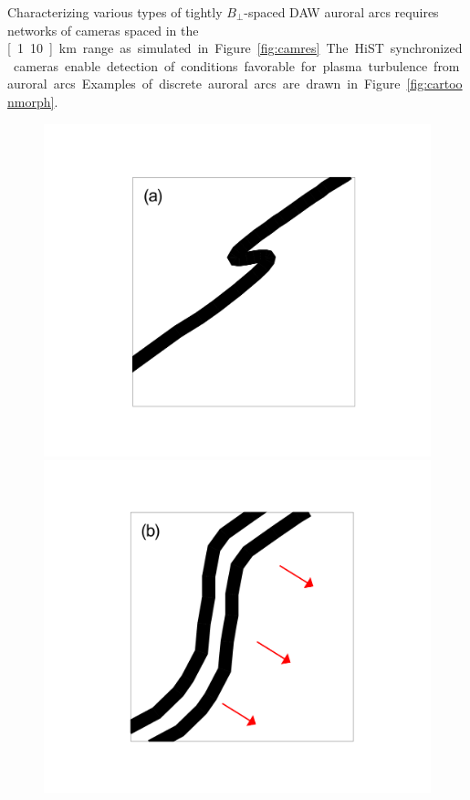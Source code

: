 Characterizing various types of tightly $B_\perp$-spaced DAW auroral arcs requires networks of cameras spaced in the \unit[1..10]{km} range as simulated in Figure~\ref{fig:camres}.
The HiST synchronized cameras enable detection of conditions favorable for plasma turbulence from auroral arcs.
Examples of discrete auroral arcs are drawn in Figure~\ref{fig:cartoonmorph}.
\begin{figure}\centering
	\begin{minipage}{0.3\textwidth}\centering
		\includegraphics[width=0.9\columnwidth,trim=150 100 150 100,clip]{gfx/aurora_kinked}
	\end{minipage}
	\begin{minipage}{0.3\textwidth}\centering
		\includegraphics[width=0.9\columnwidth,trim=150 100 150 100,clip]{gfx/aurora_split}

\end{minipage}
\end{figure}
